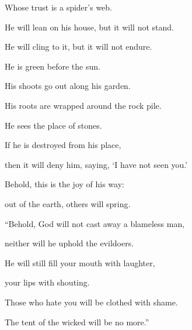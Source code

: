 {\par }{\QB Whose trust is a spider’s web.
\par }{\Q {}He will lean on his house, but it will not stand.
\par }{\QB He will cling to it, but it will not endure.
\par }{\Q {}He is green before the sun.
\par }{\QB His shoots go out along his garden.
\par }{\Q {}His roots are wrapped around the rock pile.
\par }{\QB He sees the place of stones.
\par }{\Q {}If he is destroyed from his place,
\par }{\QB then it will deny him, saying, ‘I have not seen you.’
\par }{\Q {}Behold, this is the joy of his way:
\par }{\QB out of the earth, others will spring.
\par }{\BB \par }{\Q {}“Behold, God will not cast away a blameless man,
\par }{\QB neither will he uphold the evildoers.
\par }{\Q {}He will still fill your mouth with laughter,
\par }{\QB your lips with shouting.
\par }{\Q {}Those who hate you will be clothed with shame.
\par }{\QB The tent of the wicked will be no more.”

}
